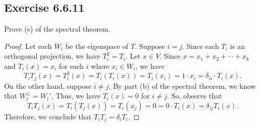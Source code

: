 \subsection*{Exercise 6.6.11} Prove (c) of the spectral theorem.
\begin{proof}
    Let each \( {W}_{i}  \) be the eigenspace of \( T \). Suppose \( i = j  \). Since each \( {T}_{i}  \) is an orthogonal projection, we have \( T_{i}^{2} = {T}_{i}  \). Let \( x \in V  \). Since \( x = {x}_{1} + {x}_{2} + \cdots + {x}_{k } \) and \( {T}_{i}(x) = {x}_{i} \) for each \( i \) where \( {x}_{i} \in {W}_{i} \), we have
    \[ {T}_{i}{T}_{j}(x) = {T}_{i}^{2}(x) = {T}_{i}({T}_{i}(x)) = {T}_{i}({x}_{i}) = 1 \cdot {x}_{i} = {\delta}_{ii}  \cdot {T}_{i}(x).  \]
    On the other hand, suppose \( i \neq j  \). By part (b) of the spectral theorem, we know that \( {W}_{i}^{\perp} = {W}_{i}'  \). Thus, we have \( {T}_{i}(x) = 0   \) for \( i \neq j  \). So, observe that 
    \[  {T}_{i}{T}_{j}(x) = {T}_{i}({T}_{j}(x)) = {T}_{i}({x}_{j}) = 0 = 0 \cdot {T}_{i}(x) = {\delta}_{ij} {T}_{i}(x). \]
    Therefore, we conclude that \( {T}_{i}{T}_{j} = {\delta}_{i} {T}_{i}  \).
\end{proof}


